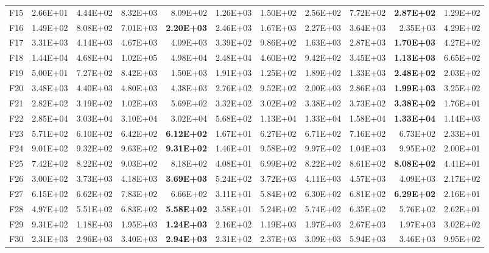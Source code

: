 \begin{tabular}{lrrrrrrrrrr}
F15 & 2.66E+01 & 4.44E+02 & 8.32E+03 & 8.09E+02 & 1.26E+03 & 1.50E+02 & 2.56E+02 & 7.72E+02 & \textbf{2.87E+02} & 1.29E+02 \\
F16 & 1.49E+02 & 8.08E+02 & 7.01E+03 & \textbf{2.20E+03} & 2.46E+03 & 1.67E+03 & 2.27E+03 & 3.64E+03 & 2.35E+03 & 4.29E+02 \\
F17 & 3.31E+03 & 4.14E+03 & 4.67E+03 & 4.09E+03 & 3.39E+02 & 9.86E+02 & 1.63E+03 & 2.87E+03 & \textbf{1.70E+03} & 4.27E+02 \\
F18 & 1.44E+04 & 4.68E+04 & 1.02E+05 & 4.98E+04 & 2.48E+04 & 4.60E+02 & 9.42E+02 & 3.45E+03 & \textbf{1.13E+03} & 6.65E+02 \\
F19 & 5.00E+01 & 7.27E+02 & 8.42E+03 & 1.50E+03 & 1.91E+03 & 1.25E+02 & 1.89E+02 & 1.33E+03 & \textbf{2.48E+02} & 2.03E+02 \\
F20 & 3.48E+03 & 4.40E+03 & 4.80E+03 & 4.38E+03 & 2.76E+02 & 9.52E+02 & 2.00E+03 & 2.86E+03 & \textbf{1.99E+03} & 3.25E+02 \\
F21 & 2.82E+02 & 3.19E+02 & 1.02E+03 & 5.69E+02 & 3.32E+02 & 3.02E+02 & 3.38E+02 & 3.73E+02 & \textbf{3.38E+02} & 1.76E+01 \\
F22 & 2.85E+04 & 3.03E+04 & 3.10E+04 & 3.02E+04 & 5.68E+02 & 1.13E+04 & 1.33E+04 & 1.58E+04 & \textbf{1.33E+04} & 1.14E+03 \\
F23 & 5.71E+02 & 6.10E+02 & 6.42E+02 & \textbf{6.12E+02} & 1.67E+01 & 6.27E+02 & 6.71E+02 & 7.16E+02 & 6.73E+02 & 2.33E+01 \\
F24 & 9.01E+02 & 9.32E+02 & 9.63E+02 & \textbf{9.31E+02} & 1.46E+01 & 9.58E+02 & 9.97E+02 & 1.04E+03 & 9.95E+02 & 2.00E+01 \\
F25 & 7.42E+02 & 8.22E+02 & 9.03E+02 & 8.18E+02 & 4.08E+01 & 6.99E+02 & 8.22E+02 & 8.61E+02 & \textbf{8.08E+02} & 4.41E+01 \\
F26 & 3.00E+02 & 3.73E+03 & 4.18E+03 & \textbf{3.69E+03} & 5.24E+02 & 3.72E+03 & 4.11E+03 & 4.57E+03 & 4.09E+03 & 2.17E+02 \\
F27 & 6.15E+02 & 6.62E+02 & 7.83E+02 & 6.66E+02 & 3.11E+01 & 5.84E+02 & 6.30E+02 & 6.81E+02 & \textbf{6.29E+02} & 2.16E+01 \\
F28 & 4.97E+02 & 5.51E+02 & 6.83E+02 & \textbf{5.58E+02} & 3.58E+01 & 5.24E+02 & 5.74E+02 & 6.35E+02 & 5.76E+02 & 2.62E+01 \\
F29 & 9.31E+02 & 1.18E+03 & 1.95E+03 & \textbf{1.24E+03} & 2.16E+02 & 1.19E+03 & 1.97E+03 & 2.67E+03 & 1.97E+03 & 3.02E+02 \\
F30 & 2.31E+03 & 2.96E+03 & 3.40E+03 & \textbf{2.94E+03} & 2.31E+02 & 2.37E+03 & 3.09E+03 & 5.94E+03 & 3.46E+03 & 9.95E+02 \\
\bottomrule
\end{tabular}
